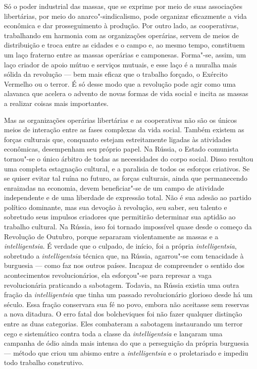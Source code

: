 Só o poder industrial das massas, que se exprime por meio de suas
associações libertárias, por meio do anarco"-sindicalismo, pode
organizar eficazmente a vida econômica e dar prosseguimento à produção.
Por outro lado, as cooperativas, trabalhando em harmonia com as
organizações operárias, servem de meios de distribuição e troca entre
as cidades e o campo e, ao mesmo tempo, constituem um laço fraterno
entre as massas operárias e camponesas.  Forma"-se, assim, um laço 
criador de apoio mútuo e serviços mutuais, e esse laço é a muralha mais
sólida da revolução --- bem mais eficaz que o trabalho forçado, o
Exército Vermelho ou o terror. É só desse modo que a revolução pode
agir como uma alavanca que acelera o advento de novas formas de vida
social e incita as massas a realizar coisas mais importantes.

Mas as organizações operárias libertárias e as cooperativas não são os
únicos meios de interação entre as fases complexas da vida social.
Também existem as forças culturais que, conquanto estejam estreitamente
ligadas às atividades econômicas, desempenham seu próprio papel. Na
Rússia, o Estado comunista tornou"-se o único árbitro de todas as
necessidades do corpo social. Disso resultou uma completa estagnação
cultural, e a paralisia de todos os esforços criativos. Se se quiser
evitar tal ruína no futuro, as forças culturais, ainda que permanecendo
enraizadas na economia, devem beneficiar"-se de um campo de atividade
independente e de uma liberdade de expressão total. Não é sua adesão ao
partido político dominante, mas sua devoção à revolução, seu saber, seu
talento e sobretudo seus impulsos criadores que permitirão determinar
sua aptidão ao trabalho cultural. Na Rússia, isso foi tornado
impossível quase desde o começo da Revolução de Outubro, porque
separaram violentamente as massas e a \textit{intelligentsia}. É verdade que o
culpado, de início, foi a própria \textit{intelligentsia}, sobretudo a \textit{intelligentsia}
técnica que, na Rússia, agarrou"-se com tenacidade à burguesia --- como
faz nos outros países. Incapaz de compreender o sentido dos
acontecimentos revolucionários, ela esforçou"-se para represar a vaga
revolucionária praticando a sabotagem. Todavia, na Rússia existia uma
outra fração da \textit{intelligentsia} que tinha um passado revolucionário
glorioso desde há um século. Essa fração conservara sua fé no povo,
embora não aceitasse sem reservas a nova ditadura. O erro fatal dos
bolcheviques foi não fazer qualquer distinção entre as duas
categorias. Eles combateram a sabotagem instaurando um terror cego e
sistemático contra toda a classe da \textit{intelligentsia} e lançaram uma
campanha de ódio ainda mais intensa do que a perseguição da própria
burguesia --- método que criou um abismo entre a \textit{intelligentsia} e o
proletariado e impediu todo trabalho construtivo.

